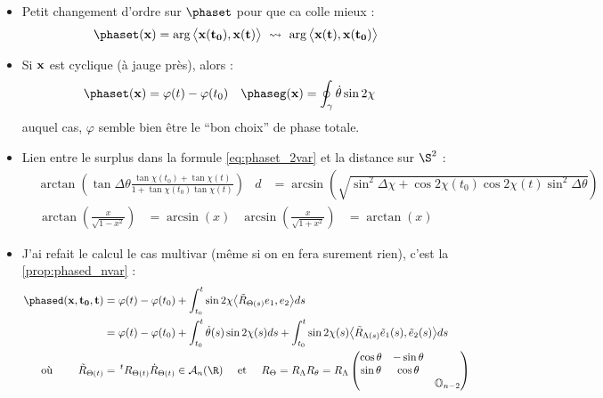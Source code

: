 \begin{itemize}
	
	\item Petit changement d'ordre sur $\phaset$ pour que ca colle mieux :
	\[\phaset(\bf{x}) = \arg\big\langle \bf{x}(t_0), \bf{x}(t)\big\rangle\ \leadsto\  \arg\big\langle \bf{x}(t), \bf{x}(t_0)\big\rangle\]
	
	\item Si $\bf{x}$ est cyclique (à jauge près), alors :
	\begin{align*}
		\phaset(\bf{x}) &= \varphi(t)-\varphi(t_0)  &  \phaseg(\bf{x}) &= \oint_\gamma \dot{\theta} \sin2\chi
	\end{align*}
	auquel cas, $\varphi$ semble bien être le ``bon choix'' de phase totale.
	
	\item Lien entre le surplus dans la formule \eqref{eq:phaset_2var} et la distance sur $\S^2$ :
	\begin{align*}
		&\arctan\left(\tan\Delta\theta \frac{ \tan\chi(t_0)+\tan\chi(t)}{1 + \tan\chi(t_0)\tan\chi(t)}\right)  &
		d &= \arcsin\left(\sqrt{\sin^2\Delta\chi + \cos2\chi(t_0) \cos2\chi(t) \sin^2\Delta\theta}\right)
	\end{align*}
	\begin{align*}
		\arctan\left( \frac{x}{\sqrt{1-x^2}}\right) &= \arcsin(x) & \arcsin\left( \frac{x}{\sqrt{1+x^2}}\right) &= \arctan(x)
	\end{align*}
	
	\item J'ai refait le calcul le cas multivar (même si on en fera surement rien), c'est la \cref{prop:phased_nvar} :
	\begin{align*}
		\phased(\bf{x}, t_0,t) &= \varphi(t) -\varphi(t_0) + \int_{t_0}^t \sin2\chi \big\langle \Tilde{R}_{\Theta(s)} e_1, e_2\big\rangle ds \\
		&=\varphi(t) -\varphi(t_0) + \int_{t_0}^t \dot{\theta}(s) \sin2\chi(s) ds + \int_{t_0}^t \sin2\chi(s) \big\langle \Tilde{R}_{\Lambda(s)} \Tilde{e}_1(s),  \Tilde{e}_2(s)\big\rangle ds\\
		\text{où }\qquad \Tilde{R}_{\Theta(t)} &=\, ^tR_{\Theta(t)} \dot{R}_{\Theta(t)}\in\mathcal{A}_n(\R) \quad \text{ et }\quad R_\Theta = R_\Lambda R_\theta = R_\Lambda \begin{pmatrix}\cos\theta & -\sin\theta \\ \sin\theta & \cos\theta \\ & & \mathbb{O}_{n-2}
		\end{pmatrix}
	\end{align*}
	

\end{itemize}
